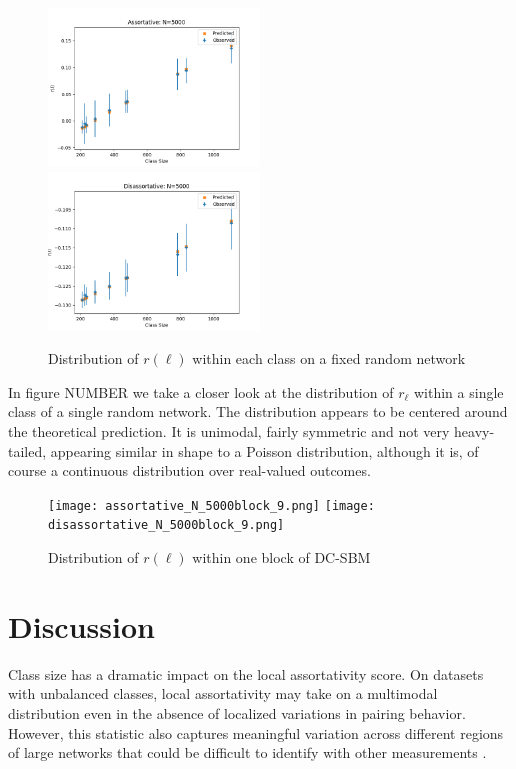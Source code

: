 \documentclass[12pt]{article}
\begin{document}
\begin{figure}[h!]
\includegraphics[width=0.5\textwidth]{assortative_N_5000.png}
\includegraphics[width=0.5\textwidth]{disassortative_N_5000.png}
\caption{Distribution of $r(\ell)$ within each class on a fixed random network}
\end{figure}

In figure NUMBER we take a closer look at the distribution of $r_\ell$ within a single class of a single random network.  The distribution appears to be centered around the theoretical prediction.  It is unimodal, fairly symmetric and not very heavy-tailed, appearing similar in shape to a Poisson distribution, although it is, of course a continuous distribution over real-valued outcomes.

\begin{figure}[h!]
\texttt{[image: assortative\_N\_5000block\_9.png]}
\texttt{[image: disassortative\_N\_5000block\_9.png]}
\caption{Distribution of $r(\ell)$ within one block of DC-SBM}
\end{figure}


\section{Discussion}

Class size has a dramatic impact on the local assortativity score.  On datasets with unbalanced classes, local assortativity may take on a multimodal distribution even in the absence of localized variations in pairing behavior.  However, this statistic also captures meaningful variation across different regions of large networks that could be difficult to identify with other measurements \cite{Peel:2018}.
\end{document}
